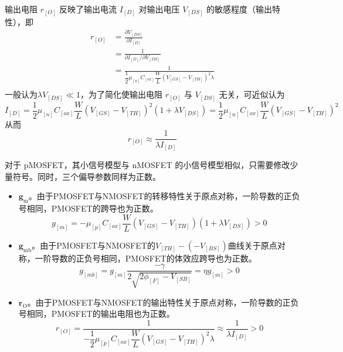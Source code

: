 输出电阻 $r_[O]$ 反映了输出电流 $I_[D]$ 对输出电压 $V_[DS]$ 的敏感程度（输出特性），即
\begin{equation}
    \begin{aligned}
        r_[O] 
        &= \frac{\partial V_[DS]}{\partial I_[D]} \\
        &= \frac{1}{\partial I_[D] / \partial V_[DS]} \\
        &= \frac{1}{\dfrac{1}{2} \mu_[n] C_[ox] \dfrac{W}{L} \left( V_[GS] - V_[TH] \right)^2 \lambda} \\
    \end{aligned}
\end{equation}
一般认为$\lambda V_[DS] \ll 1$，为了简化使输出电阻 $r_[O]$ 与 $V_[DS]$ 无关，可近似认为
\begin{equation}
    I_[D] = \dfrac{1}{2} \mu_[n] C_[ox] \dfrac{W}{L} \left( V_[GS] - V_[TH] \right)^2 \left( 1 + \lambda V_[DS] \right) = \dfrac{1}{2} \mu_[n] C_[ox] \dfrac{W}{L} \left( V_[GS] - V_[TH] \right)^2
\end{equation}
从而
\begin{equation}
    r_[O] \approx \frac{1}{\lambda I_[D]}
\end{equation}

对于 pMOSFET，其小信号模型与 nMOSFET 的小信号模型相似，只需要修改少量符号。同时，三个偏导参数同样为正数。
\begin{itemize}
    \item $\bm{g_{\mathrm{m}}}$。由于PMOSFET与NMOSFET的转移特性关于原点对称，一阶导数的正负号相同，PMOSFET的跨导也为正数。
        \begin{equation}
            g_[m] = -\mu_[p] C_[ox] \frac{W}{L} \left( V_[GS] - V_[TH] \right) \left( 1 + \lambda V_[DS] \right) > 0
        \end{equation}
    \item $\bm{g_{\mathrm{mb}}}$。由于PMOSFET与NMOSFET的$V_[TH] - (-V_[BS])$曲线关于原点对称，一阶导数的正负号相同，PMOSFET的体效应跨导也为正数。
        \begin{equation}
            g_[mb] = g_[m] \frac{-\gamma}{2\sqrt{2 \phi_[F] - V_[SB]}} = \eta g_[m] > 0
        \end{equation}
    \item $\bm{r_\mathrm{O}}$。由于PMOSFET与NMOSFET的输出特性关于原点对称，一阶导数的正负号相同，PMOSFET的输出电阻也为正数。
        \begin{equation}
            r_[O] = \frac{1}{-\dfrac{1}{2} \mu_[p] C_[ox] \dfrac{W}{L} \left( V_[GS] - V_[TH] \right)^2 \lambda} \approx \frac{1}{\lambda I_[D]} > 0
        \end{equation}
\end{itemize}

